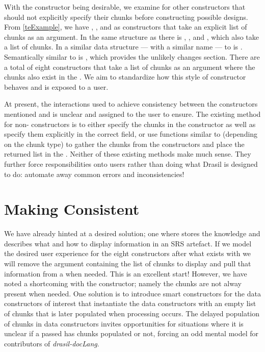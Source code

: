 With the  constructor being desirable, we examine  for other constructors that should not explicitly specify their chunks before constructing possible designs. From \autoref{teExample}, we have , , and  as constructors that take an explicit list of chunks as an argument. In the same structure as  there is , , and , which also take a list of chunks. In a similar data structure --- with a similar name --- to  is . Semantically similar to  is , which provides the unlikely changes section. There are a total of eight constructors that take a list of chunks as an argument where the chunks also exist in the . We aim to standardize how this style of  constructor behaves and is exposed to a user.

At present, the interactions used to achieve consistency between the \linebreak{} constructors mentioned and  is unclear and assigned to the user to ensure. The existing method for non- constructors is to either specify the chunks in the constructor as well as specify them explicitly in the correct  field, or use functions similar to  (depending on the chunk type) to gather the chunks from the  constructors and place the returned list in the . Neither of these existing methods make much sense. They further force responsibilities onto users rather than doing what Drasil is designed to do: automate away common errors and inconsistencies!

\section{Making  Consistent}\label{diFraming}
We have already hinted at a desired solution; one where  stores the knowledge and  describes what and how to display information in an SRS artefact. If we model the desired user experience for the eight constructors after what exists with  we will remove the argument containing the list of chunks to display and pull that information from a  when needed. This is an excellent start! However, we have noted a shortcoming with the  constructor; namely the chunks are not alway present when needed. One solution is to introduce smart constructors for the data constructors of interest that instantiate the data constructors with an empty list of chunks that is later populated when  processing occurs. The delayed population of chunks in data constructors invites opportunities for situations where it is unclear if a passed  has chunks populated or not, forcing an odd mental model for contributors of \textit{drasil-docLang}.

